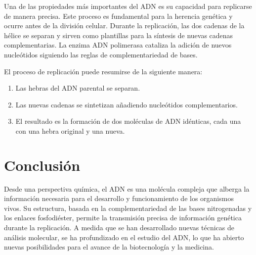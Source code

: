 Una de las propiedades más importantes del ADN es su capacidad para replicarse de manera precisa. Este proceso es fundamental para la herencia genética y ocurre antes de la división celular. Durante la replicación, las dos cadenas de la hélice se separan y sirven como plantillas para la síntesis de nuevas cadenas complementarias. La enzima ADN polimerasa cataliza la adición de nuevos nucleótidos siguiendo las reglas de complementariedad de bases.

El proceso de replicación puede resumirse de la siguiente manera:

\begin{enumerate}
\item Las hebras del ADN parental se separan.
\item Las nuevas cadenas se sintetizan añadiendo nucleótidos complementarios.
\item El resultado es la formación de dos moléculas de ADN idénticas, cada una con una hebra original y una nueva.
\end{enumerate}

\section{Conclusión}

Desde una perspectiva química, el ADN es una molécula compleja que alberga la información necesaria para el desarrollo y funcionamiento de los organismos vivos. Su estructura, basada en la complementariedad de las bases nitrogenadas y los enlaces fosfodiéster, permite la transmisión precisa de información genética durante la replicación. A medida que se han desarrollado nuevas técnicas de análisis molecular, se ha profundizado en el estudio del ADN, lo que ha abierto nuevas posibilidades para el avance de la biotecnología y la medicina.

